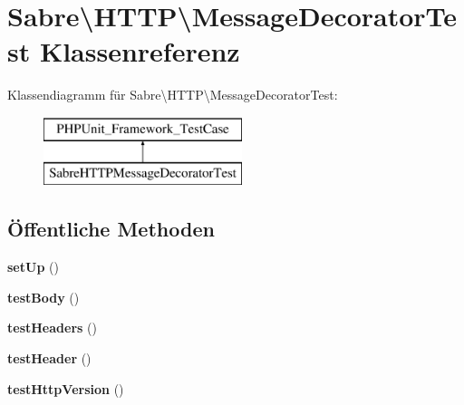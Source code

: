 \hypertarget{class_sabre_1_1_h_t_t_p_1_1_message_decorator_test}{}\section{Sabre\textbackslash{}H\+T\+TP\textbackslash{}Message\+Decorator\+Test Klassenreferenz}
\label{class_sabre_1_1_h_t_t_p_1_1_message_decorator_test}
Klassendiagramm für Sabre\textbackslash{}H\+T\+TP\textbackslash{}Message\+Decorator\+Test\+:\begin{figure}[H]
\begin{center}
\leavevmode
\includegraphics[height=2.000000cm]{class_sabre_1_1_h_t_t_p_1_1_message_decorator_test}
\end{center}
\end{figure}
\subsection*{Öffentliche Methoden}
\begin{DoxyCompactItemize}
\item 
\mbox{\label{class_sabre_1_1_h_t_t_p_1_1_message_decorator_test_a3d87246e74170fc855a42bc41831cc55}} 
{\bfseries set\+Up} ()
\item 
\mbox{\label{class_sabre_1_1_h_t_t_p_1_1_message_decorator_test_ac5d775f0b26cab2255e210e660c65e01}} 
{\bfseries test\+Body} ()
\item 
\mbox{\label{class_sabre_1_1_h_t_t_p_1_1_message_decorator_test_a8740b86f31ddc487bb01e7b0f23f218c}} 
{\bfseries test\+Headers} ()
\item 
\mbox{\label{class_sabre_1_1_h_t_t_p_1_1_message_decorator_test_a4d2250ca32fd5181beceb4136d654ba0}} 
{\bfseries test\+Header} ()
\item 
\mbox{\label{class_sabre_1_1_h_t_t_p_1_1_message_decorator_test_a2bd435532ce53328cd43d8b82c63630c}} 
{\bfseries test\+Http\+Version} ()
\end{DoxyCompactItemize}
